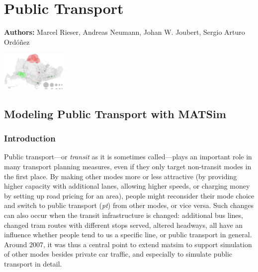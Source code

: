 \chapter{Public Transport}
\label{ch:pt}

\hfill \textbf{Authors:} Marcel Rieser, Andreas Neumann, Johan W. Joubert, Sergio Arturo Ordóñez

\begin{center} \includegraphics[width=0.25\textwidth, angle=0]{extending/figures/ebr/Backwards.png} \end{center}


\section{Modeling Public Transport with MATSim}
\subsection{Introduction}
Public transport---or \emph{transit} as it is sometimes called---plays
an important role in many transport planning measures, even if they only target
non-transit modes in the first place. By making other modes more or less
attractive (\eg by providing higher capacity with additional lanes, allowing
higher speeds, or charging money by setting up road pricing for an area), people
might reconsider their mode choice and switch to public transport (\emph{pt})
from other modes, or vice versa. Such changes can also occur when the transit
infrastructure is changed: additional bus lines, changed tram routes with
different stops served, altered headways, all have an influence whether
people tend to us a specific line, or public transport in general. Around 2007,
it was thus a central point to extend \gls{matsim} to support simulation of other
modes besides private car traffic, and especially to simulate public transport
in detail.

